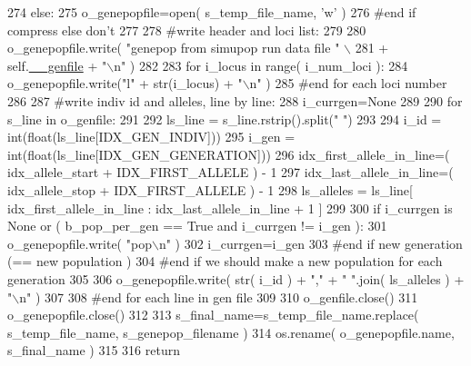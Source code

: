 \begin{DoxyCode}
274         \textcolor{keywordflow}{else}:
275             o\_genepopfile=open( s\_temp\_file\_name, \textcolor{stringliteral}{'w'} )
276         \textcolor{comment}{#end if compress else don't}
277 
278         \textcolor{comment}{#write header and loci list:}
279 
280         o\_genepopfile.write( \textcolor{stringliteral}{"genepop from simupop run data file "} \(\backslash\)
281                 + self.\hyperlink{classnegui_1_1pgoutputsimupop_1_1PGOutputSimuPop_a30fb6b94af13efad6becfbe6fddc1d95}{\_\_genfile} + \textcolor{stringliteral}{"\(\backslash\)n"} )
282 
283         \textcolor{keywordflow}{for} i\_locus \textcolor{keywordflow}{in} range( i\_num\_loci ):
284             o\_genepopfile.write(\textcolor{stringliteral}{"l"} + str(i\_locus) + \textcolor{stringliteral}{"\(\backslash\)n"} )
285         \textcolor{comment}{#end for each loci number}
286 
287         \textcolor{comment}{#write indiv id and alleles, line by line:}
288         i\_currgen=\textcolor{keywordtype}{None}
289 
290         \textcolor{keywordflow}{for} s\_line \textcolor{keywordflow}{in} o\_genfile:
291             
292             ls\_line = s\_line.rstrip().split(\textcolor{stringliteral}{" "})
293 
294             i\_id = int(float(ls\_line[IDX\_GEN\_INDIV]))
295             i\_gen = int(float(ls\_line[IDX\_GEN\_GENERATION]))
296             idx\_first\_allele\_in\_line=( idx\_allele\_start + IDX\_FIRST\_ALLELE ) - 1
297             idx\_last\_allele\_in\_line=( idx\_allele\_stop  + IDX\_FIRST\_ALLELE ) - 1 
298             ls\_alleles = ls\_line[ idx\_first\_allele\_in\_line : idx\_last\_allele\_in\_line + 1 ]
299 
300             \textcolor{keywordflow}{if} i\_currgen \textcolor{keywordflow}{is} \textcolor{keywordtype}{None} \textcolor{keywordflow}{or} ( b\_pop\_per\_gen == \textcolor{keyword}{True} \textcolor{keywordflow}{and} i\_currgen != i\_gen ):
301                     o\_genepopfile.write( \textcolor{stringliteral}{"pop\(\backslash\)n"} )
302                     i\_currgen=i\_gen
303                 \textcolor{comment}{#end if new generation (== new population )}
304                 \textcolor{comment}{#end if we should make a new population for each generation}
305 
306             o\_genepopfile.write( str( i\_id ) + \textcolor{stringliteral}{","} +  \textcolor{stringliteral}{" "}.join( ls\_alleles ) + \textcolor{stringliteral}{"\(\backslash\)n"}  )
307 
308         \textcolor{comment}{#end for each line in gen file}
309 
310         o\_genfile.close()
311         o\_genepopfile.close()
312 
313         s\_final\_name=s\_temp\_file\_name.replace( s\_temp\_file\_name, s\_genepop\_filename )
314         os.rename( o\_genepopfile.name, s\_final\_name )
315 
316         \textcolor{keywordflow}{return}
\end{DoxyCode}


